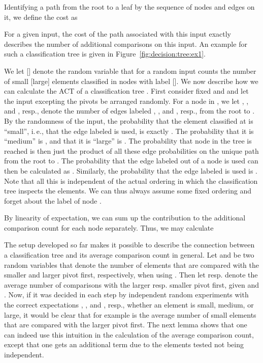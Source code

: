 \documentclass[prodmode,acmtalg]{acmsmall}
\begin{document}
Identifying a path  from the root to a leaf  by the sequence of nodes and 
edges  on it, we define the cost  as 

For a given input, the cost of the path associated with this input exactly describes the number of additional
comparisons on this input. An example for such a classification tree is given in Figure~\ref{fig:decision:tree:ex1}.

We let  [] denote the random variable that for a random input
counts the number of small [large] elements classified in nodes with label
 [].  We now describe how we can calculate the ACT of a
classification tree . First consider fixed  and  and let the input
excepting the pivots be arranged randomly.  For a node  in ,  we let
, , and , resp., denote the number of edges labeled ,
, and , resp., from the root to . By the randomness of the
input, the probability that the element classified at  is ``small'', i.\,e.,
that the edge labeled  is used,  is exactly . The probability that it is ``medium'' is , and that it is ``large'' is . The
probability  that node  in the tree is reached is then just
the product of all these edge probabilities on the unique path from the root to
.  The probability that the edge labeled  out of a node  is used
can then be calculated as .
Similarly, the probability that the edge labeled  is used is
. Note that all this is
independent of the actual ordering in which the classification tree inspects
the elements. We can thus always assume some fixed ordering and forget about
the label  of node .
    
 By linearity of expectation, we can sum up the
    contribution to the additional comparison count for each node separately.
    Thus, we may calculate
   
The setup developed so far makes it possible to describe the connection between a classification tree  
and its average comparison count in general. 
Let  and  be two random variables that denote the
number of elements that are compared
with the smaller and larger pivot first, respectively,  when using . 
Then let  resp. 
 denote the average number of
comparisons with the larger resp. smaller pivot first, given  and . 
Now, if it was decided in each step by independent random experiments
with the correct expectations , , and , resp.,
whether an element is small, medium, or large, it would be clear that for example  is the average number of small elements that are compared with the larger pivot
first. The next lemma shows that one can indeed use this intuition in the
calculation of the average comparison count, except that one gets an additional  term due to 
the elements tested not being independent. 
\end{document}
